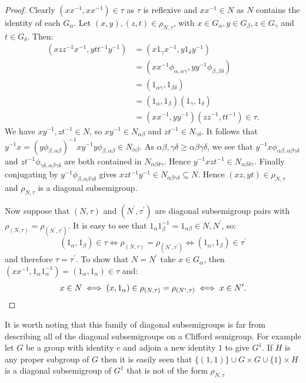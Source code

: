\documentclass[a4paper, 12pt,reqno]{amsart}
\theoremstyle{plain}
\theoremstyle{definition}
\theoremstyle{remark}
\begin{document}
\begin{proof}
    Clearly $(x x^{-1} , x x^{-1}) \in \tau$ as $\tau$ is reflexive and $x x^{-1} \in N$ as $N$ contains the identity of each $G_\alpha$.
    Let $(x,y),(z,t) \in \rho_{N,\tau}$, with $x \in G_\alpha , y \in G_\beta , z \in G_\gamma$ and $t \in G_\delta$. 
    Then:
    \begin{align*}
        (xz z^{-1} x^{-1}, y t t^{-1} y^{-1}) & = (x 1_\gamma x^{-1} , y 1_\delta y^{-1}) \\
        & = (x x^{-1} \phi_{\alpha, \alpha \gamma} ,yy^{-1} \phi_{\beta,\beta \delta}) \\
        & = (1_{\alpha \gamma} , 1_{\beta \delta}) \\
        & = (1_\alpha, 1_{\beta})(1_{\gamma}, 1_\delta) \\
        & = (xx^{-1},yy^{-1})(zz^{-1},tt^{-1}) \in \tau.
    \end{align*}
    We have $xy^{-1},zt^{-1} \in N$, so $xy^{-1} \in N_{\alpha \beta}$ and $zt^{-1} \in N_{\gamma \delta}$.
    It follows that $y^{-1} x = (y \phi_{\beta , \alpha \beta})^{-1} xy^{-1} y \phi_{\beta , \alpha \beta} \in N_{\alpha \beta}$.
    As $\alpha \beta,\gamma \delta \geq \alpha \beta \gamma \delta$, we see that $y^{-1}x \phi_{\alpha \beta , \alpha \beta \gamma \delta} $ and $ zt^{-1} \phi_{\gamma \delta, \alpha \beta \gamma \delta}$ are both contained in $N_{\alpha \beta \delta \gamma}$.
    Hence $y^{-1} x z t^{-1} \in N_{\alpha \beta \delta \gamma}$.
    Finally conjugating by $y^{-1} \phi_{\beta , \alpha \beta \gamma \delta}$ gives $xz t^{-1}y^{-1} \in N_{\alpha \beta \gamma \delta} \subseteq N$.
    Hence $(xz,yt) \in \rho_{N,\tau}$ and $\rho_{N,\tau}$ is a diagonal subsemigroup.

    Now suppose that $(N,\tau)$ and $(N^\prime,\tau^\prime)$ are diagonal subsemigroup pairs with $\rho_{(N,\tau)} = \rho_{(N^\prime,\tau^\prime)}$.
    It is easy to see that $1_\alpha 1_\beta^{-1} = 1_{\alpha \beta} \in N , N^\prime$, so:
    \begin{equation*}
        (1_\alpha,1_\beta) \in \tau \iff \rho_{(N,\tau)} = \rho_{(N^\prime,\tau^\prime)} \iff (1_\alpha,1_\beta) \in \tau^\prime
    \end{equation*}
    and therefore $\tau = \tau^\prime$.
    To show that $N = N^\prime$ take $x \in G_\alpha$, then $(xx^{-1},1_\alpha 1_\alpha^{-1}) = (1_\alpha,1_\alpha) \in \tau$ and:
    \begin{equation*}
        x \in N \iff (x,1_\alpha) \in \rho_{(N,\tau)} = \rho_{(N^\prime,\tau)} \iff x \in N^\prime. \qedhere
    \end{equation*}
\end{proof}
It is worth noting that this family of diagonal subsemigroups is far from describing all of the diagonal subsemigroups on a Clifford semigroup.
For example let $G$ be a group with identity $e$ and adjoin a new identity $1$ to give $G^1$.
If $H$ is any proper subgroup of $G$ then it is easily seen that $\{(1,1) \} \cup G \times G \cup \{1\} \times H$ is a diagonal subsemigroup of $G^{1}$ that is not of the form $\rho_{N,\tau}$
\end{document}

